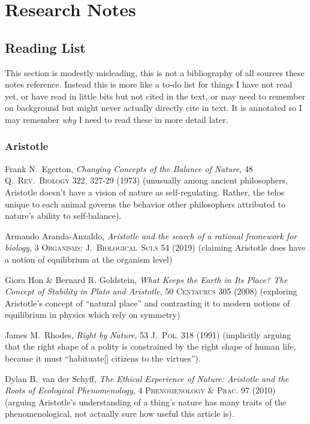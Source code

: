 \documentclass[../FGP.tex]{subfiles}
\begin{document}
\section{Research Notes}
\subsection{Reading List}
This section is modestly misleading, this is not a bibliography of all sources these notes reference. Instead this is more like a to-do list for things I have not read yet, or have read in little bits but not cited in the text, or may need to remember on background but might never actually directly cite in text. It is annotated so I may remember \emph{why} I need to read these in more detail later. 
\subsubsection{Aristotle}\label{biblio:aristotle}
\begin{annotated-bibliography}
  \item Frank N.~Egerton, \textit{Changing Concepts of the Balance of Nature}, 48 \textsc{Q.~Rev.~Biology} 322, 327-29 (1973) (unusually among ancient philosophers, Aristotle doesn't have a vision of nature as self-regulating. Rather, the telos unique to each animal governs the behavior other philosophers attributed to nature's ability to self-balance).
  \item Armando Aranda-Anzaldo, \textit{Aristotle and the search of a rational framework for biology}, 3 \textsc{Organisms: J.~Biological~Sci.s} 54 (2019) (claiming Aristotle does have a notion of equilibrium at the organism level) 
  \item Giora Hon \& Bernard R. Goldstein, \textit{What Keeps the Earth in Its Place? The Concept of Stability in Plato and Aristotle}, 50 \textsc{Centaurus} 305 (2008) (exploring Aristotle's concept of ``natural place'' and contrasting it to modern notions of equilibrium in physics which rely on symmetry)
  \item James M.~Rhodes, \textit{Right by Nature}, 53 \textsc{J.~Pol.} 318 (1991) (implicitly arguing that the right shape of a polity is constrained by the right shape of human life, because it must ``habituate[] citizens to the virtues'').
  \item Dylan B.~van der Schyff, \textit{The Ethical Experience of Nature: Aristotle and the Roots of Ecological Phenomenology}, 4 \textsc{Phenomenology \& Prac.} 97 (2010) (arguing Aristotle's understanding of a thing's nature has many traits of the phenomenological, not actually sure how useful this article is).
\end{annotated-bibliography}
\end{document}
